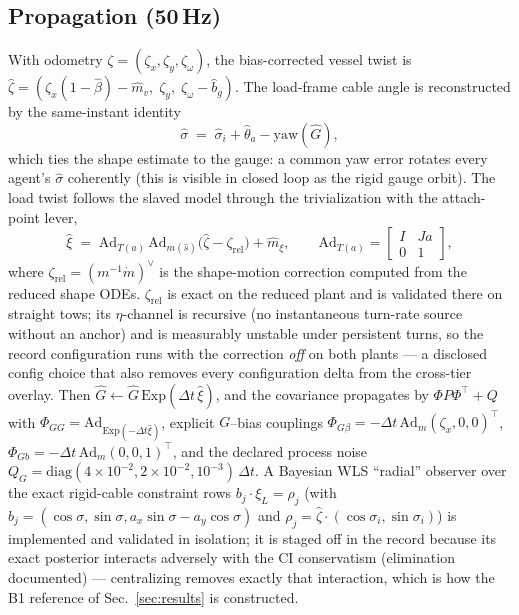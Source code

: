 \documentclass[letterpaper, 10pt, journal]{IEEEtran}
\begin{document}
\subsection{Propagation (50\,Hz)}
With odometry $\zeta = (\zeta_x, \zeta_y, \zeta_\omega)$, the bias-corrected
vessel twist is $\hat\zeta = (\zeta_x(1-\hat\beta) - \hat m_v,\; \zeta_y,\;
\zeta_\omega - \hat b_g)$. The load-frame cable angle is reconstructed by the
same-instant identity
\begin{equation}\label{eq:sameinstant}
\hat\sigma \;=\; \hat\sigma_i + \hat\theta_a - \mathrm{yaw}(\hat G),
\end{equation}
which ties the shape estimate to the gauge: a common yaw error rotates every
agent's $\hat\sigma$ coherently (this is visible in closed loop as the rigid
gauge orbit). The load twist follows the slaved model through the
trivialization with the attach-point lever,
\begin{equation}\label{eq:slaved}
\hat\xi \;=\; \mathrm{Ad}_{T(a)}\,\mathrm{Ad}_{m(\hat s)}
\bigl(\hat\zeta - \zeta_{\mathrm{rel}}\bigr) + \hat m_\xi ,
\qquad
\mathrm{Ad}_{T(a)} = \begin{bmatrix} I & Ja \\ 0 & 1\end{bmatrix},
\end{equation}
where $\zeta_{\mathrm{rel}} = (m^{-1}\dot m)^\vee$ is the shape-motion
correction computed from the reduced shape ODEs. $\zeta_{\mathrm{rel}}$ is
exact on the reduced plant and is validated there on straight tows; its
$\eta$-channel is recursive (no instantaneous turn-rate source without an
anchor) and is measurably unstable under persistent turns, so the record
configuration runs with the correction \emph{off} on both plants --- a
disclosed config choice that also removes every configuration delta from the
cross-tier overlay. Then $\hat G \leftarrow \hat G\,\mathrm{Exp}(\Delta t\,
\hat\xi)$, and the covariance propagates by $\Phi P \Phi^\top + Q$ with
$\Phi_{GG} = \mathrm{Ad}_{\mathrm{Exp}(-\Delta t \hat\xi)}$, explicit
$G$--bias couplings $\Phi_{G\beta} = -\Delta t\, \mathrm{Ad}_{m}
(\zeta_x, 0, 0)^\top$, $\Phi_{Gb} = -\Delta t\, \mathrm{Ad}_m (0,0,1)^\top$,
and the declared process noise $Q_G = \mathrm{diag}(4{\times}10^{-2},
2{\times}10^{-2}, 10^{-3})\,\Delta t$. A Bayesian WLS ``radial'' observer over
the exact rigid-cable constraint rows $b_j \cdot \xi_L = \rho_j$ (with
$b_j = (\cos\sigma, \sin\sigma, a_x \sin\sigma - a_y\cos\sigma)$ and $\rho_j =
\hat\zeta\cdot(\cos\sigma_i, \sin\sigma_i)$) is implemented and validated in
isolation; it is staged off in the record because its exact posterior
interacts adversely with the CI conservatism (elimination documented) ---
centralizing removes exactly that interaction, which is how the B1 reference
of Sec.~\ref{sec:results} is constructed.
\end{document}
